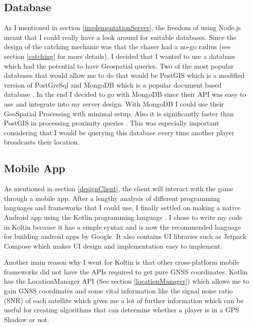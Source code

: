 \documentclass{l4proj}
\begin{document}
\subsection{Database}
\label{implementationDatabase}
As I mentioned in section \ref{implementationServer}, the freedom of using Node.js meant that I could really have a look
around for suitable databases. Since the design of the catching mechanic was that the chaser had a no-go radius (see section
\ref{catching} for more details), I decided that I wanted to use a database which had the potential to have Geospatial queries.
Two of the most popular databases that would allow me to do that would be PostGIS which is a modified version of PostGreSql \citep{postgis, postgres} and
MongoDB which is a popular document based database \citep{mongodb}. In the end I decided to go with MongoDB since their API
was easy to use and integrate into my server design. With MongoDB I could use their GeoSpatial Processing with minimal setup. Also it is significantly
faster than PostGIS in processing proximity queries \citep{Bartoszewski2019}. This was especially important considering
that I would be querying this database every time another player broadcasts their location.

\subsection{Mobile App}
As mentioned in section \ref{designClient}, the client will interact with the game through a mobile app. After a lengthy
analysis of different programming languages and frameworks that I could use, I finally settled on making a native Android
app using the Kotlin programming language \citep{kotlin}. I chose to write my code in Koltin because it has a simple syntax
and is now the recommended language for building android apps by Google. It also contains UI libraries such as Jetpack Compose 
which makes UI design and implementation easy to implement.

Another main reason why I went for Koltin is that other cross-platform mobile frameworks did not have the APIs required
to get pure GNSS coordinates. Kotlin has the LocationManager API (See section \ref{locationManager}) which allows me
to gain GNSS coordinates and some vital information like the signal noise ratio (SNR) of each satellite \citep{locationManager}
which gives me a lot of further information which can be useful for creating algorithms that can determine whether a player
is in a GPS Shadow or not.
\end{document}
